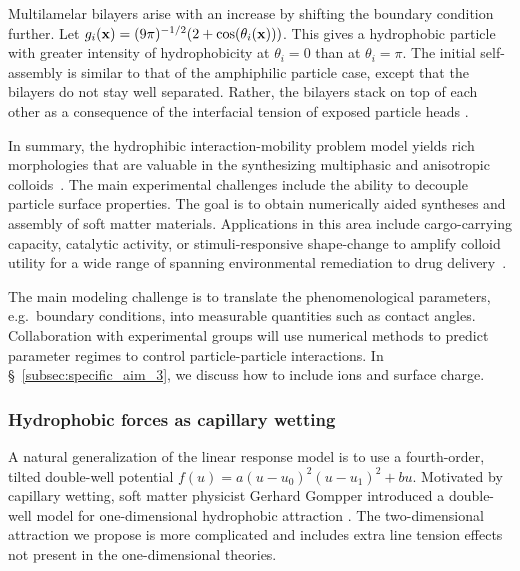 Multilamelar bilayers arise with an increase by shifting the boundary
condition further. Let $g_i(\mathbf{x}) = (9\pi )^{-1/2}(2 +
\cos(\theta_i(\mathbf{x})))$. This gives a hydrophobic particle with greater
intensity of hydrophobicity at $\theta_i = 0$ than at $\theta_i = \pi$.
The initial self-assembly is similar to that of the amphiphilic particle
case, except that the bilayers do not stay well separated. Rather, the
bilayers stack on top of each other as a consequence of the interfacial
tension of exposed particle heads \cite{deMeetal21}. 

In summary, the hydrophibic interaction-mobility problem model yields
rich morphologies that are valuable in the synthesizing multiphasic and
anisotropic colloids~\cite{Bradley2016,Mallory2017,Bradley2017}. The
main experimental challenges include the ability to decouple particle
surface properties. The goal is to obtain numerically aided syntheses
and assembly of soft matter materials. Applications in this area include
cargo-carrying capacity, catalytic activity, or stimuli-responsive
shape-change to amplify colloid utility for a wide range of spanning
environmental remediation to drug delivery~\cite{McBr21, HaBr20}.



The main modeling challenge is to translate the phenomenological
parameters, e.g.~boundary conditions, into measurable quantities such as
contact angles. Collaboration with experimental groups will use
numerical methods to predict parameter regimes to control
particle-particle interactions. In \S~\ref{subsec:specific_aim_3}, we
discuss how to include ions and surface charge. 

\subsubsection{Hydrophobic forces as capillary wetting}
A natural generalization of the linear response model is to use a
fourth-order, tilted double-well potential $f(u) = a(u-u_0)^2(u-u_1)^2 +
bu$. Motivated by capillary wetting, soft matter physicist Gerhard
Gompper introduced a double-well model for one-dimensional
hydrophobic attraction \cite{GoHaKo94}. The two-dimensional attraction
we propose is more complicated and includes extra line tension effects
not present in the one-dimensional theories. 

